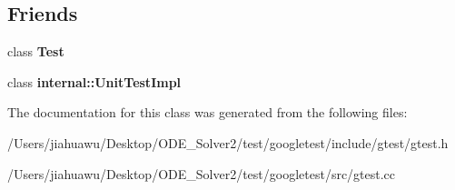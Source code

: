 \subsection*{Friends}
\begin{DoxyCompactItemize}
\item 
\mbox{\label{classtesting_1_1_test_case_a5b78b1c2e1fa07ffed92da365593eaa4}} 
class {\bfseries Test}
\item 
\mbox{\label{classtesting_1_1_test_case_acc0a5e7573fd6ae7ad1878613bb86853}} 
class {\bfseries internal\+::\+Unit\+Test\+Impl}
\end{DoxyCompactItemize}


The documentation for this class was generated from the following files\+:\begin{DoxyCompactItemize}
\item 
/\+Users/jiahuawu/\+Desktop/\+O\+D\+E\+\_\+\+Solver2/test/googletest/include/gtest/gtest.\+h\item 
/\+Users/jiahuawu/\+Desktop/\+O\+D\+E\+\_\+\+Solver2/test/googletest/src/gtest.\+cc\end{DoxyCompactItemize}
